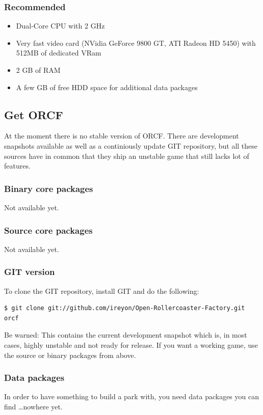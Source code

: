 \documentclass[a4paper]{article}
\begin{document}
\subsubsection{Recommended}
\label{sysrecomm}
\begin{itemize}
  \item Dual-Core CPU with 2 GHz
  \item Very fast video card (NVidia GeForce 9800 GT, ATI Radeon HD 5450) with 512MB of dedicated VRam
  \item 2 GB of RAM
  \item A few GB of free HDD space for additional data packages
\end{itemize}


\subsection{Get ORCF}
At the moment there is no stable version of ORCF. There are development snapshots available as well as a continiously update GIT repository,
but all these sources have in common that they ship an unstable game that still lacks lot of features.

\subsubsection{Binary core packages}
Not available yet.

\subsubsection{Source core packages}
Not available yet.

\subsubsection{GIT version}
To clone the GIT repository, install GIT and do the following:
\begin{lstlisting}
$ git clone git://github.com/ireyon/Open-Rollercoaster-Factory.git orcf
\end{lstlisting}
Be warned: This contains the current development snapshot which is, in most cases, highly unstable and not ready for release.
If you want a working game, use the source or binary packages from above.

\subsubsection{Data packages}
In order to have something to build a park with, you need data packages you can find \dots nowhere yet.
\end{document}
